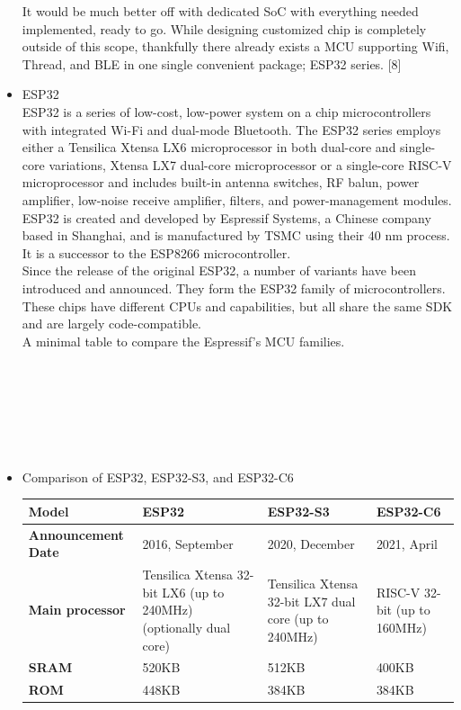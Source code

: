 \documentclass[conference]{IEEEtran}
\begin{document}
\begin{itemize}
It would be much better off with dedicated SoC with everything needed implemented, ready to go. While designing customized chip is completely outside of this scope, thankfully there already exists a MCU supporting Wifi, Thread, and BLE in one single convenient package; ESP32 series. [8]\\
\item ESP32\\
ESP32 is a series of low-cost, low-power system on a chip microcontrollers with integrated Wi-Fi and dual-mode Bluetooth. The ESP32 series employs either a Tensilica Xtensa LX6 microprocessor in both dual-core and single-core variations, Xtensa LX7 dual-core microprocessor or a single-core RISC-V microprocessor and includes built-in antenna switches, RF balun, power amplifier, low-noise receive amplifier, filters, and power-management modules. ESP32 is created and developed by Espressif Systems, a Chinese company based in Shanghai, and is manufactured by TSMC using their 40 nm process. It is a successor to the ESP8266 microcontroller.\\
Since the release of the original ESP32, a number of variants have been introduced and announced. They form the ESP32 family of microcontrollers. These chips have different CPUs and capabilities, but all share the same SDK and are largely code-compatible.\\
A minimal table to compare the Espressif's MCU families.\\
\\\\\\\\\\\\
\item Comparison of ESP32, ESP32-S3, and ESP32-C6
\setlength{\extrarowheight}{2.5pt}
\begin{table}[H]
\centering
\begin{tabular}{|m{1.8cm}|m{1.8cm}|m{1.8cm}|m{1.8cm}|}
\hline
\textbf{Model} & \textbf{ESP32} & \textbf{ESP32-S3} & \textbf{ESP32-C6} \\
\hline
\textbf{Announcement Date} & 2016, September & 2020, December & 2021, April \\
\textbf{Main processor} & Tensilica Xtensa 32-bit LX6 (up to 240MHz) (optionally dual core) & Tensilica Xtensa 32-bit LX7 dual core (up to 240MHz) & RISC-V 32-bit (up to 160MHz) \\
\textbf{SRAM} & 520KB & 512KB & 400KB \\
\textbf{ROM} & 448KB & 384KB & 384KB \\

\end{tabular}
\end{table}
\end{itemize}
\end{document}
